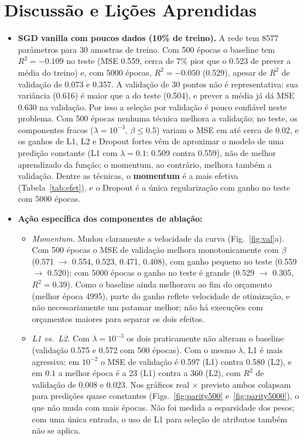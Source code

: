 \documentclass[11pt,a4paper]{article}
\begin{document}
\section{Discussão e Lições Aprendidas}
\begin{itemize}
\item \textbf{SGD vanilla com poucos dados (10\% de treino).} A rede tem 8577 parâmetros para 30 amostras de treino. Com 500 épocas o baseline tem $R^2=-0.109$ no teste (MSE 0.559, cerca de 7\% pior que o 0.523 de prever a média do treino) e, com 5000 épocas, $R^2=-0.050$ (0.529), apesar de $R^2$ de validação de 0.073 e 0.357. A validação de 30 pontos não é representativa: sua variância (0.616) é maior que a do teste (0.504), e prever a média já dá MSE 0.630 na validação. Por isso a seleção por validação é pouco confiável neste problema. Com 500 épocas nenhuma técnica melhora a validação; no teste, os componentes fracos ($\lambda=10^{-3}$, $\beta\le0.5$) variam o MSE em até cerca de 0.02, e os ganhos de L1, L2 e Dropout fortes vêm de aproximar o modelo de uma predição constante (L1 com $\lambda=0.1$: 0.509 contra 0.559), não de melhor aprendizado da função; o momentum, ao contrário, melhora também a validação. Dentre as técnicas, o \textbf{momentum} é a mais efetiva (Tabela~\ref{tab:efet}), e o Dropout é a única regularização com ganho no teste com 5000 épocas.
\item \textbf{Ação específica dos componentes de ablação:}
  \begin{itemize}
  \item \textit{Momentum.} Mudou claramente a velocidade da curva (Fig.~\ref{fig:val}a). Com 500 épocas o MSE de validação melhora monotonicamente com $\beta$ (0.571 $\to$ 0.554, 0.523, 0.471, 0.408), com ganho pequeno no teste (0.559 $\to$ 0.520); com 5000 épocas o ganho no teste é grande (0.529 $\to$ 0.305, $R^2=0.39$). Como o baseline ainda melhorava ao fim do orçamento (melhor época 4995), parte do ganho reflete velocidade de otimização, e não necessariamente um patamar melhor; não há execuções com orçamentos maiores para separar os dois efeitos.
  \item \textit{L1 vs.\ L2.} Com $\lambda=10^{-3}$ os dois praticamente não alteram o baseline (validação 0.575 e 0.572 com 500 épocas). Com o mesmo $\lambda$, L1 é mais agressiva: em $10^{-2}$ o MSE de validação é 0.597 (L1) contra 0.580 (L2), e em $0.1$ a melhor época é a 23 (L1) contra a 360 (L2), com $R^2$ de validação de 0.008 e 0.023. Nos gráficos real $\times$ previsto ambos colapsam para predições quase constantes (Figs.~\ref{fig:parity500} e~\ref{fig:parity5000}), o que não muda com mais épocas. Não foi medida a esparsidade dos pesos; com uma única entrada, o uso de L1 para seleção de atributos também não se aplica.

\end{itemize}
\end{itemize}
\end{document}
